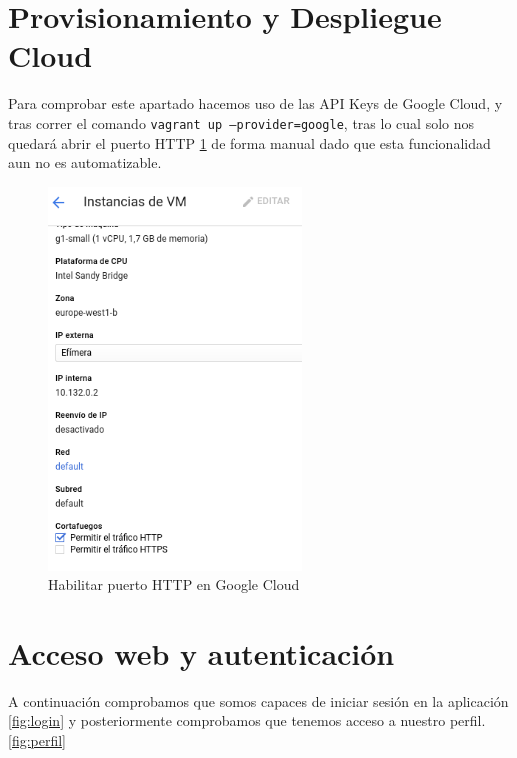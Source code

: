 \section {Provisionamiento y Despliegue Cloud}
Para comprobar este apartado hacemos uso de las API Keys de Google Cloud, y tras correr el comando \texttt{vagrant up --provider=google}, tras lo cual solo nos quedará abrir el puerto HTTP \ref{fig:http} de forma manual dado que esta funcionalidad aun no es automatizable.

\begin{figure}
  \begin{center}
    \includegraphics[width=0.6\textwidth]{imagenes/http.png}
    \caption{Habilitar puerto HTTP en Google Cloud}
    \label{fig:http}
  \end{center}
\end{figure}


\section {Acceso web y autenticación}

A continuación comprobamos que somos capaces de iniciar sesión en la aplicación \ref{fig:login} y posteriormente comprobamos que tenemos acceso a nuestro perfil. \ref{fig:perfil}

